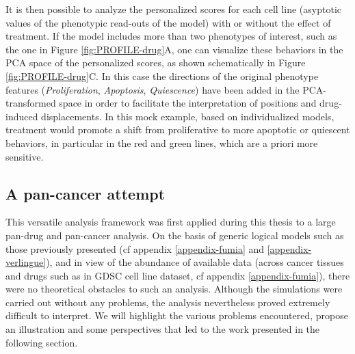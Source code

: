 \documentclass[a4paper,12pt,twoside,onecolumn,openright,final,oldfontcommands]{memoir}
\begin{document}
It is then possible to analyze the personalized scores for each cell
line (asyptotic values of the phenotypic read-outs of the model) with or
without the effect of treatment. If the model includes more than two
phenotypes of interest, such as the one in Figure
\ref{fig:PROFILE-drug}A, one can visualize these behaviors in the PCA
space of the personalized scores, as shown schematically in Figure
\ref{fig:PROFILE-drug}C. In this case the directions of the original
phenotype features (\emph{Proliferation}, \emph{Apoptosis},
\emph{Quiescence}) have been added in the PCA-transformed space in order
to facilitate the interpretation of positions and drug-induced
displacements. In this mock example, based on individualized models,
treatment would promote a shift from proliferative to more apoptotic or
quiescent behaviors, in particular in the red and green lines, which are
a priori more sensitive.

\subsection{A pan-cancer attempt}\label{a-pan-cancer-attempt}

This versatile analysis framework was first applied during this thesis
to a large pan-drug and pan-cancer analysis. On the basis of generic
logical models such as those previously presented (cf appendix
\ref{appendix-fumia} and \ref{appendix-verlingue}), and in view of the
abundance of available data (across cancer tissues and drugs such as in
GDSC cell line dataset, cf appendix \ref{appendix-fumia}), there were no
theoretical obstacles to such an analysis. Although the simulations were
carried out without any problems, the analysis nevertheless proved
extremely difficult to interpret. We will highlight the various problems
encountered, propose an illustration and some perspectives that led to
the work presented in the following section.
\end{document}
